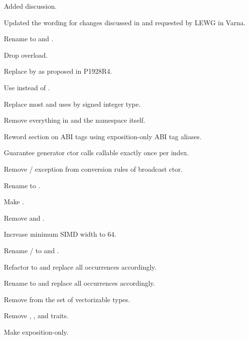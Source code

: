 \begin{revision}
\item Added  discussion.
\end{revision}

\begin{revision}
\item Updated the wording for changes discussed in and requested by LEWG in Varna.
\item Rename to  and .
\item Drop  overload.
\item Replace  by  as proposed in P1928R4.
\item Use  instead of .
\item Replace most  and  uses by  signed integer type.
\item Remove everything in  and the namespace itself.
\item Reword section on ABI tags using exposition-only ABI tag aliases.
\item Guarantee generator ctor calls callable exactly once per index.
\item Remove / exception from conversion rules of broadcast ctor.
\item Rename  to .
\item Make  .
\item Remove  and .
\item Increase minimum SIMD width to 64.
\item Rename / to  and .
\item Refactor  to  and replace all occurrences accordingly.
\item Rename  to  and replace all occurrences accordingly.
\item Remove  from the set of vectorizable types.
\item Remove , , and  traits.
\item Make  exposition-only.
\end{revision}

